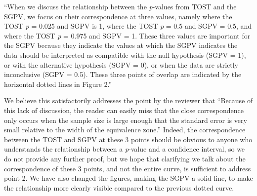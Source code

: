 \documentclass[man]{apa6}
\begin{document}
\enquote{When we discuss the relationship between the \emph{p}-values
from TOST and the SGPV, we focus on their correspondence at three
values, namely where the TOST \emph{p} = 0.025 and SGPV is 1, where the
TOST \emph{p} = 0.5 and SGPV = 0.5, and where the TOST \emph{p} = 0.975
and SGPV = 1. These three values are important for the SGPV because they
indicate the values at which the SGPV indicates the data should be
interpreted as compatible with the null hypothesis (SGPV = 1), or with
the alternative hypothesis (SGPV = 0), or when the data are strictly
inconclusive (SGPV = 0.5). These three points of overlap are indicated
by the horizontal dotted lines in Figure 2.}

We believe this satisfactorily addresses the point by the reviewer that
\enquote{Because of this lack of discussion, the reader can easily miss
that the close correspondence only occurs when the sample size is large
enough that the standard error is very small relative to the width of
the equivalence zone.} Indeed, the correspondence between the TOST and
SGPV at these 3 points should be obvious to anyone who understands the
relationship between a \emph{p}-value and a confidence interval, so we
do not provide any further proof, but we hope that clarifying we talk
about the correspondence of these 3 points, and not the entire curve, is
sufficient to address point 2. We have also changed the figures, making
the SGPV a solid line, to make the relationship more clearly visible
compared to the previous dotted curve.
\end{document}
